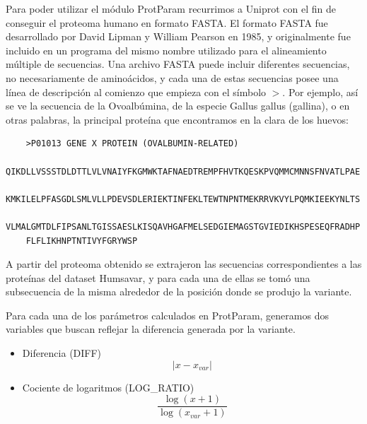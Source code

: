 Para poder utilizar el módulo ProtParam recurrimos a Uniprot con el fin de conseguir el proteoma humano en formato FASTA. El formato FASTA fue desarrollado por David Lipman y William Pearson en 1985, y originalmente fue incluido en un programa del mismo nombre utilizado para el alineamiento múltiple de secuencias. Una archivo FASTA puede incluir diferentes secuencias, no necesariamente de aminoácidos, y cada una de estas secuencias posee una línea de descripción al comienzo que empieza con el símbolo $>$. Por ejemplo, así se ve la secuencia de la Ovoalbúmina, de la especie Gallus gallus (gallina), o en otras palabras, la principal proteína que encontramos en la clara de los huevos:

\begin{verbatim}
	>P01013 GENE X PROTEIN (OVALBUMIN-RELATED)
	QIKDLLVSSSTDLDTTLVLVNAIYFKGMWKTAFNAEDTREMPFHVTKQESKPVQMMCMNNSFNVATLPAE
	KMKILELPFASGDLSMLVLLPDEVSDLERIEKTINFEKLTEWTNPNTMEKRRVKVYLPQMKIEEKYNLTS
	VLMALGMTDLFIPSANLTGISSAESLKISQAVHGAFMELSEDGIEMAGSTGVIEDIKHSPESEQFRADHP
	FLFLIKHNPTNTIVYFGRYWSP
\end{verbatim}

\pagebreak

A partir del proteoma obtenido se extrajeron las secuencias correspondientes a las proteínas del dataset Humsavar, y para cada una de ellas se tomó una subsecuencia de la misma alrededor de la posición donde se produjo la variante.




\vspace{2mm}
\vspace{2mm}

Para cada una de los parámetros calculados en ProtParam, generamos dos variables que buscan reflejar la diferencia generada por la variante. 

\begin{itemize}
    \item Diferencia (DIFF) 
    $$|x - x_{var}|$$
    \item Cociente de logaritmos (LOG\_RATIO)
    $$\frac{\log{(x + 1)}}{\log{(x_{var} + 1)}}$$  
\end{itemize}

